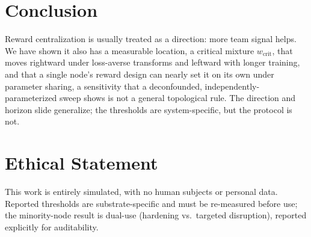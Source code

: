 \documentclass[letterpaper]{article} %
\theoremstyle{plain}
\newcommand{\wcrit}{w_{\mathrm{crit}}}
\begin{document}
\section{Conclusion}
\label{sec:conclusion}

Reward centralization is usually treated as a direction: more team signal helps. We have shown it also
has a measurable location, a critical mixture $\wcrit$, that moves rightward under loss-averse
transforms and leftward with longer training, and that a single node's reward design can nearly set it
on its own under parameter sharing, a sensitivity that a deconfounded, independently-parameterized
sweep shows is not a general topological rule. The direction and horizon slide generalize; the
thresholds are system-specific, but the protocol is not.

\section*{Ethical Statement}

This work is entirely simulated, with no human subjects or personal data. Reported thresholds are
substrate-specific and must be re-measured before use; the minority-node result is dual-use
(hardening vs.\ targeted disruption), reported explicitly for auditability.


\end{document}
